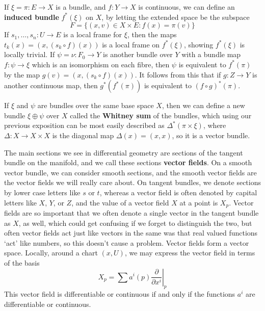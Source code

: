 \begin{example}
    If $\xi = \pi: E \to X$ is a bundle, and $f: Y \to X$ is continuous, we can define an {\bf induced bundle} $f^*(\xi)$ on $X$, by letting the extended space be the subspace
    \[ F = \{ (x,v) \in X \times E: f(x) = \pi(v) \} \]
    If $s_1, \dots, s_n: U \to E$ is a local frame for $\xi$, then the maps $t_k(x) = (x,(s_k \circ f)(x))$ is a local frame on $f^*(\xi)$, showing $f^*(\xi)$ is locally trivial. If $\psi = \nu: F_0 \to Y$ is another bundle over $Y$ with a bundle map $f: \psi \to \xi$ which is an isomorphism on each fibre, then $\psi$ is equivalent to $f^*(\pi)$ by the map $g(v) = (x, (s_k \circ f)(x))$. It follows from this that if $g: Z \to Y$ is another continuous map, then $g^*(f^*(\pi))$ is equivalent to $(f \circ g)^*(\pi)$.
\end{example}

\begin{example}
    If $\xi$ and $\psi$ are bundles over the same base space $X$, then we can define a new bundle $\xi \oplus \psi$ over $X$ called the {\bf Whitney sum} of the bundles, which using our previous exposition can be most easily described as $\Delta^*(\pi \times \xi)$, where $\Delta: X \to X \times X$ is the diagonal map $\Delta(x) = (x,x)$, so it is a vector bundle.
\end{example}

The main sections we see in differential geometry are sections of the tangent bundle on the manifold, and we call these sections {\bf vector fields}. On a smooth vector bundle, we can consider smooth sections, and the smooth vector fields are the vector fields we will really care about. On tangent bundles, we denote sections by lower case letters like $s$ or $t$, whereas a vector field is often denoted by capital letters like $X$, $Y$, or $Z$, and the value of a vector field $X$ at a point is $X_p$. Vector fields are so important that we often denote a single vector in the tangent bundle as $X$, as well, which could get confusing if we forget to distinguish the two, but often vector fields act just like vectors in the same was that real valued functions `act' like numbers, so this doesn't cause a problem. Vector fields form a vector space. Locally, around a chart $(x,U)$, we may express the vector field in terms of the basis
%
\[ X_p = \sum a^i(p) \left.\frac{\partial}{\partial x^i}\right|_p \]
%
This vector field is differentiable or continuous if and only if the functions $a^i$ are differentiable or continuous.

